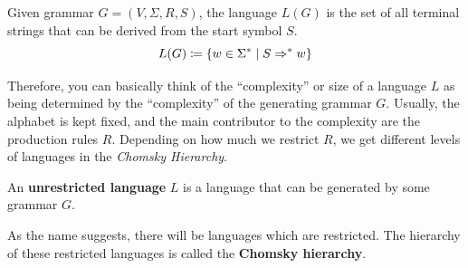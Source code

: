   \begin{definition}
    \label{def:transitive-closure}
  \end{definition}

  \begin{definition}
    \label{def:language-generated-by-grammar}
    Given grammar $G = (V, \Sigma, R, S)$, the language $L(G)$ is the set of all terminal strings that can be derived from the start symbol $S$. 
    \begin{equation}
      L(G) \coloneqq \{ w \in \Sigma^\ast \mid S \Rightarrow^\ast w \}
    \end{equation}
  \end{definition}

  Therefore, you can basically think of the ``complexity'' or size of a language $L$ as being determined by the ``complexity'' of the generating grammar $G$. Usually, the alphabet is kept fixed, and the main contributor to the complexity are the production rules $R$. Depending on how much we restrict $R$, we get different levels of languages in the \textit{Chomsky Hierarchy}. 

  \begin{definition}[Unrestricted]
    \label{def:unrestricted}
    An \textbf{unrestricted language} $L$ is a language that can be generated by some grammar $G$. 
  \end{definition}

	As the name suggests, there will be languages which are restricted. The hierarchy of these restricted languages is called the \textbf{Chomsky hierarchy}. 

